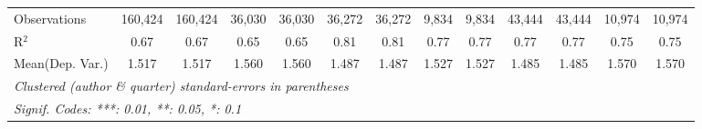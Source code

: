 \begin{tabular}{lcccccccccccc}
   Observations                             & 160,424        & 160,424      & 36,030       & 36,030  & 36,272         & 36,272       & 9,834        & 9,834       & 43,444  & 43,444  & 10,974  & 10,974\\  
   R$^2$                                    & 0.67           & 0.67         & 0.65         & 0.65    & 0.81           & 0.81         & 0.77         & 0.77        & 0.77    & 0.77    & 0.75    & 0.75\\  
Mean(Dep. Var.) & 1.517 & 1.517 & 1.560 & 1.560 & 1.487 & 1.487 & 1.527 & 1.527 & 1.485 & 1.485 & 1.570 & 1.570 \\
   \midrule \midrule
   \multicolumn{13}{l}{\emph{Clustered (author \& quarter) standard-errors in parentheses}}\\
   \multicolumn{13}{l}{\emph{Signif. Codes: ***: 0.01, **: 0.05, *: 0.1}}\\
\end{tabular}
\par\endgroup
